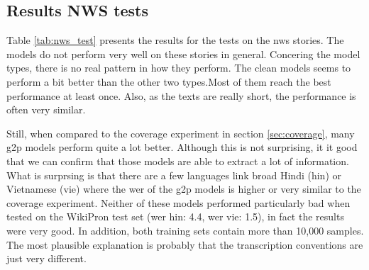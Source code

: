 \subsection{Results NWS tests}
Table \ref{tab:nws_test} presents the results for the tests on the \ac{nws} stories. The models do not perform very well on these stories in general. Concering the model types, there is no real pattern in how they perform. The clean models seems to perform a bit better than the other two types.Most of them reach the best performance at least once. Also, as the texts are really short, the performance is often very similar.

Still, when compared to the coverage experiment in section \ref{sec:coverage}, many \ac{g2p} models perform quite a lot better. Although this is not surprising, it it good that we can confirm that those models are able to extract a lot of information. What is surprsing is that there are a few languages link broad Hindi (hin) or Vietnamese (vie) where the \ac{wer} of the \ac{g2p} models is higher or very similar to the coverage experiment. Neither of these models performed particularly bad when tested on the WikiPron test set (\ac{wer} hin: 4.4, \ac{wer} vie: 1.5), in fact the results were very good. In addition, both training sets contain more than 10,000 samples. The most plausible explanation is probably that the transcription conventions are just very different. 


